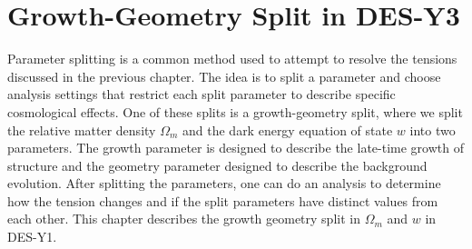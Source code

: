 \chapter{Growth-Geometry Split in DES-Y3}
Parameter splitting is a common method used to attempt to resolve the tensions discussed in the previous chapter. The idea is to split a parameter and choose analysis settings that restrict each split parameter to describe specific cosmological effects. One of these splits is a growth-geometry split, where we split the relative matter density $\Omega_m$ and the dark energy equation of state $w$ into two parameters. The growth parameter is designed to describe the late-time growth of structure and the geometry parameter designed to describe the background evolution. After splitting the parameters, one can do an analysis to determine how the tension changes and if the split parameters have distinct values from each other. This chapter describes the growth geometry split in $\Omega_m$ and $w$ in DES-Y1.
